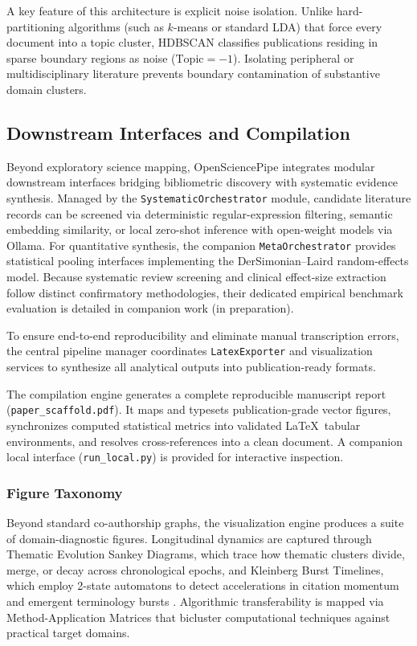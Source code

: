 \documentclass[preprint,12pt]{elsarticle}
\begin{document}
A key feature of this architecture is explicit noise isolation. Unlike hard-partitioning algorithms (such as $k$-means or standard LDA) that force every document into a topic cluster, HDBSCAN classifies publications residing in sparse boundary regions as noise ($\text{Topic} = -1$). Isolating peripheral or multidisciplinary literature prevents boundary contamination of substantive domain clusters.

\subsection{Downstream Interfaces and Compilation}
\label{sec:tier5}
Beyond exploratory science mapping, OpenSciencePipe integrates modular downstream interfaces bridging bibliometric discovery with systematic evidence synthesis. Managed by the \texttt{SystematicOrchestrator} module, candidate literature records can be screened via deterministic regular-expression filtering, semantic embedding similarity, or local zero-shot inference with open-weight models via Ollama. For quantitative synthesis, the companion \texttt{MetaOrchestrator} provides statistical pooling interfaces implementing the DerSimonian--Laird random-effects model. Because systematic review screening and clinical effect-size extraction follow distinct confirmatory methodologies, their dedicated empirical benchmark evaluation is detailed in companion work (in preparation).

To ensure end-to-end reproducibility and eliminate manual transcription errors, the central pipeline manager coordinates \texttt{LatexExporter} and visualization services to synthesize all analytical outputs into publication-ready formats.

The compilation engine generates a complete reproducible manuscript report (\nolinkurl{paper_scaffold.pdf}). It maps and typesets publication-grade vector figures, synchronizes computed statistical metrics into validated \LaTeX\ tabular environments, and resolves cross-references into a clean document. A companion local interface (\texttt{run\_local.py}) is provided for interactive inspection.

\subsubsection{Figure Taxonomy}
Beyond standard co-authorship graphs, the visualization engine produces a suite of domain-diagnostic figures. Longitudinal dynamics are captured through Thematic Evolution Sankey Diagrams, which trace how thematic clusters divide, merge, or decay across chronological epochs, and Kleinberg Burst Timelines, which employ 2-state automatons to detect accelerations in citation momentum and emergent terminology bursts \cite{kleinberg2003bursty}. Algorithmic transferability is mapped via Method-Application Matrices that bicluster computational techniques against practical target domains.
\end{document}
